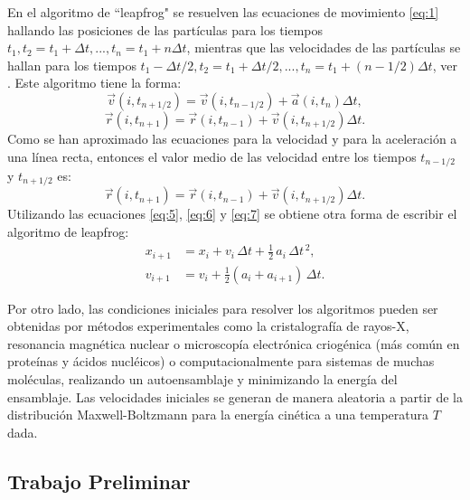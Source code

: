 \documentclass[12pt]{article}
\begin{document}
En el algoritmo de ``leapfrog" se resuelven las ecuaciones de movimiento \eqref{eq:1} hallando las posiciones de las partículas para los tiempos $t_1,t_2=t_1+\Delta t,...,t_n=t_{1}+n\Delta t$, mientras que las velocidades de las partículas se hallan para los tiempos $t_1-\Delta t/2,t_2=t_1+\Delta t/2,...,t_n=t_{1}+(n-1/2)\Delta t$, ver \cite{Mazur1997CommonRevisited}.  Este algoritmo tiene la forma:
\begin{equation}\label{eq:5}
\vec{v}{(i,t_{n+1/2})}=\vec{v}{(i,t_{n-1/2})}+\vec{a}{(i,t_{n})}\Delta t,
\end{equation}
\begin{equation}\label{eq:6}
\vec{r}{(i,t_{n+1})}=\vec{r}{(i,t_{n-1})}+\vec{v}{(i,t_{n+1/2})}\Delta t.
\end{equation}
Como se han aproximado las ecuaciones para la velocidad y para la aceleración a una línea recta, entonces el valor medio de las velocidad entre los tiempos $t_{n-1/2}$ y $t_{n+1/2}$ es:
\begin{equation}\label{eq:7}
\vec{r}{(i,t_{n+1})}=\vec{r}{(i,t_{n-1})}+\vec{v}{(i,t_{n+1/2})}\Delta t.
\end{equation}
Utilizando las ecuaciones \eqref{eq:5}, \eqref{eq:6} y \eqref{eq:7} se obtiene otra forma de escribir el algoritmo de leapfrog:
\begin{eqnarray}
  x_{i+1} &= x_i + v_i\, \Delta t + \tfrac{1}{2}\,a_i\, \Delta t^{\,2}, \\
  v_{i+1} &= v_i + \tfrac{1}{2}(a_i + a_{i+1})\,\Delta t.
\end{eqnarray}

Por otro lado, las condiciones iniciales para resolver los algoritmos pueden ser obtenidas por métodos experimentales como la cristalografía de rayos-X, resonancia magnética nuclear o microscopía electrónica criogénica (más común en proteínas y ácidos nucléicos) o computacionalmente para sistemas de muchas moléculas, realizando un autoensamblaje y minimizando la energía del ensamblaje. Las velocidades iniciales se generan de manera aleatoria a partir de la distribución Maxwell-Boltzmann para la energía cinética a una temperatura $T$ dada.\\
\subsection{Trabajo Preliminar}\label{ss:pre}
\end{document}
